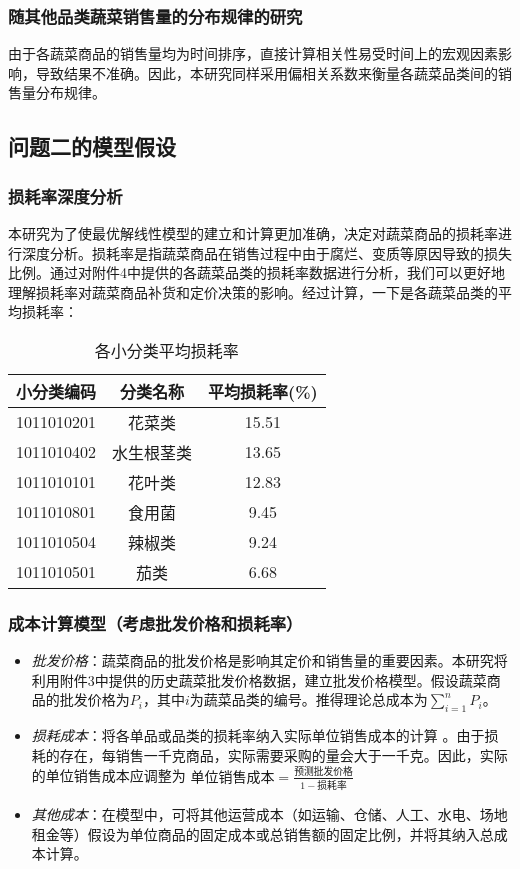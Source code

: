 \documentclass{article}
\begin{document}
\subsubsection{随其他品类蔬菜销售量的分布规律的研究}
由于各蔬菜商品的销售量均为时间排序，直接计算相关性易受时间上的宏观因素影响，导致结果不准确。因此，本研究同样采用偏相关系数来衡量各蔬菜品类间的销售量分布规律。

\subsection{问题二的模型假设}

\subsubsection{损耗率深度分析}
本研究为了使最优解线性模型的建立和计算更加准确，决定对蔬菜商品的损耗率进行深度分析。损耗率是指蔬菜商品在销售过程中由于腐烂、变质等原因导致的损失比例。通过对附件4中提供的各蔬菜品类的损耗率数据进行分析，我们可以更好地理解损耗率对蔬菜商品补货和定价决策的影响。经过计算，一下是各蔬菜品类的平均损耗率：
\begin{table}[H]
\centering
\caption{各小分类平均损耗率}
\begin{tabular}{|c|c|c|}
\hline
小分类编码 & 分类名称 & 平均损耗率(\%) \\
\hline
1011010201 & 花菜类 & 15.51 \\
1011010402 & 水生根茎类 & 13.65 \\
1011010101 & 花叶类 & 12.83 \\
1011010801 & 食用菌 & 9.45 \\
1011010504 & 辣椒类 & 9.24 \\
1011010501 & 茄类 & 6.68\\
\hline
\end{tabular}
\end{table}

\subsubsection{成本计算模型（考虑批发价格和损耗率）}
\begin{itemize}
    \item \textit{批发价格}：蔬菜商品的批发价格是影响其定价和销售量的重要因素。本研究将利用附件3中提供的历史蔬菜批发价格数据，建立批发价格模型。假设蔬菜商品的批发价格为$P_i$，其中$i$为蔬菜品类的编号。推得理论总成本为$\sum_{i=1}^{n} P_i $。
    \item \textit{损耗成本}：将各单品或品类的损耗率纳入实际单位销售成本的计算 。由于损耗的存在，每销售一千克商品，实际需要采购的量会大于一千克。因此，实际的单位销售成本应调整为 $\text{单位销售成本} = \frac{\text{预测批发价格}}{1 - \text{损耗率}}$
    \item \textit{其他成本}：在模型中，可将其他运营成本（如运输、仓储、人工、水电、场地租金等）假设为单位商品的固定成本或总销售额的固定比例，并将其纳入总成本计算。
\end{itemize}
\end{document}
